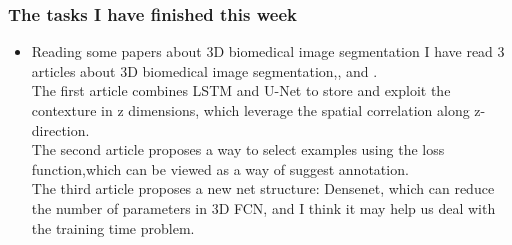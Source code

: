 \documentclass[8pt]{beamer}
\begin{document}
\begin{frame}[fragile]
\frametitle{The tasks I have finished this week}
\vspace{.3cm}
\begin{itemize}
\item Reading some papers about 3D biomedical image segmentation
	\vspace{.3cm}
	I have read 3 articles about 3D biomedical image segmentation,\cite{DBLP:journals/corr/ChenYZAC16},\cite{DBLP:journals/corr/ShrivastavaGG16} and \cite{DBLP:journals/corr/HuangLW16a}.\\
	\vspace{.3cm}
	The first article combines LSTM and U-Net to store and exploit the contexture in z dimensions, which leverage the spatial correlation along z-direction.\\
	\vspace{.3cm}
	The second article proposes a way to select examples using the loss function,which can be viewed as a way of suggest annotation.\\
	\vspace{.3cm}
	The third article proposes a new net structure: Densenet, which can reduce the number of parameters in 3D FCN, and I think it may help us deal with the training time problem.
	\vspace{.3cm}
\end{itemize}
\end{frame}
\end{document}
